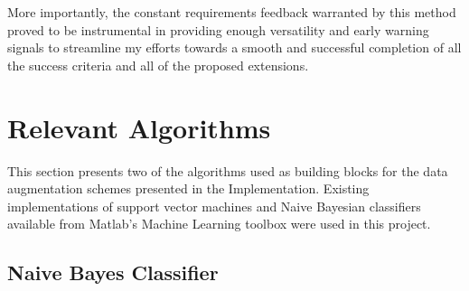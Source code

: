 \documentclass[12pt,twoside,notitlepage,amsart]{report} %
\begin{document}
{	More importantly, the constant requirements feedback warranted by this method proved to be instrumental in providing enough versatility and early warning signals to streamline my efforts towards a smooth and successful completion of all the success criteria and all of the proposed extensions.

	
	
	
	
	
	
	
	\section{Relevant Algorithms} 
	This section presents two of the algorithms used as building blocks for the data augmentation schemes presented in the Implementation. Existing implementations of support vector machines and Naive Bayesian classifiers available from Matlab's Machine Learning toolbox were used in this project. 
	
	\subsection{Naive Bayes Classifier}
	
}
\end{document}

